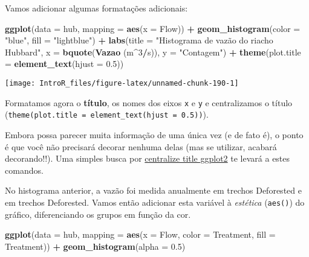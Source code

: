 \documentclass[
]{book}
\newenvironment{Shaded}{\begin{snugshade}}{\end{snugshade}}
\newcommand{\DataTypeTok}[1]{\textcolor[rgb]{0.13,0.29,0.53}{#1}}
\newcommand{\DecValTok}[1]{\textcolor[rgb]{0.00,0.00,0.81}{#1}}
\newcommand{\FloatTok}[1]{\textcolor[rgb]{0.00,0.00,0.81}{#1}}
\newcommand{\KeywordTok}[1]{\textcolor[rgb]{0.13,0.29,0.53}{\textbf{#1}}}
\newcommand{\NormalTok}[1]{#1}
\newcommand{\OperatorTok}[1]{\textcolor[rgb]{0.81,0.36,0.00}{\textbf{#1}}}
\newcommand{\StringTok}[1]{\textcolor[rgb]{0.31,0.60,0.02}{#1}}
\begin{document}
Vamos adicionar algumas formatações adicionais:

\begin{Shaded}
\begin{Highlighting}[]
\KeywordTok{ggplot}\NormalTok{(}\DataTypeTok{data =}\NormalTok{ hub, }\DataTypeTok{mapping =} \KeywordTok{aes}\NormalTok{(}\DataTypeTok{x =}\NormalTok{ Flow)) }\OperatorTok{+}
\StringTok{  }\KeywordTok{geom_histogram}\NormalTok{(}\DataTypeTok{color =} \StringTok{"blue"}\NormalTok{, }\DataTypeTok{fill =} \StringTok{"lightblue"}\NormalTok{) }\OperatorTok{+}
\StringTok{  }\KeywordTok{labs}\NormalTok{(}\DataTypeTok{title =} \StringTok{"Histograma de vazão do riacho Hubbard"}\NormalTok{, }
       \DataTypeTok{x =} \KeywordTok{bquote}\NormalTok{(}\KeywordTok{Vazao}\NormalTok{ (m}\OperatorTok{^}\DecValTok{3}\OperatorTok{/}\NormalTok{s)),}
       \DataTypeTok{y =} \StringTok{"Contagem"}\NormalTok{) }\OperatorTok{+}
\StringTok{  }\KeywordTok{theme}\NormalTok{(}\DataTypeTok{plot.title =} \KeywordTok{element_text}\NormalTok{(}\DataTypeTok{hjust =} \FloatTok{0.5}\NormalTok{))}
\end{Highlighting}
\end{Shaded}

\begin{center}\texttt{[image: IntroR\_files/figure-latex/unnamed-chunk-190-1]} \end{center}

Formatamos agora o \textbf{título}, os nomes dos eixos \texttt{x} e \texttt{y} e centralizamos o título (\texttt{theme(plot.title\ =\ element\_text(hjust\ =\ 0.5))}).

Embora possa parecer muita informação de uma única vez (e de fato é), o ponto é que você não precisará decorar nenhuma delas (mas se utilizar, acabará decorando!!). Uma simples busca por \href{https://www.google.com/search?sxsrf=ALeKk02h6lituhooE6EgHAVc2zcLsOWdLQ\%3A1594404890952\&ei=GrAIX5LrOciv5OUPnfGPsA0\&q=centralize+title+ggplot2\&oq=centralize+title+ggplot2\&gs_lcp=CgZwc3ktYWIQAzIECCMQJzoECAAQRzoHCCMQsAIQJ1CNDFjSPGDfRGgAcAF4AIABlgGIAfkIkgEDMC45mAEAoAEBqgEHZ3dzLXdpeg\&sclient=psy-ab\&ved=0ahUKEwiS4JyJpcPqAhXIF7kGHZ34A9YQ4dUDCAw\&uact=5}{centralize title ggplot2} te levará a estes comandos.

No histograma anterior, a vazão foi medida anualmente em trechos Deforested e em trechos Deforested. Vamos então adicionar esta variável à \emph{estética} (\texttt{aes()}) do gráfico, diferenciando os grupos em função da cor.

\begin{Shaded}
\begin{Highlighting}[]
\KeywordTok{ggplot}\NormalTok{(}\DataTypeTok{data =}\NormalTok{ hub, }\DataTypeTok{mapping =} \KeywordTok{aes}\NormalTok{(}\DataTypeTok{x =}\NormalTok{ Flow, }\DataTypeTok{color =}\NormalTok{ Treatment, }\DataTypeTok{fill =}\NormalTok{ Treatment)) }\OperatorTok{+}
\StringTok{  }\KeywordTok{geom_histogram}\NormalTok{(}\DataTypeTok{alpha =} \FloatTok{0.5}\NormalTok{)}
\end{Highlighting}
\end{Shaded}
\end{document}
